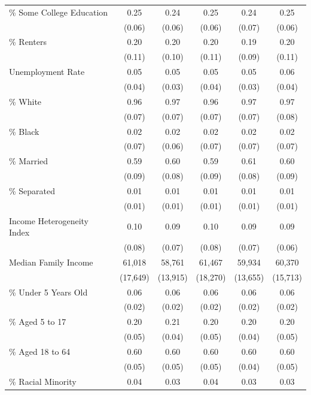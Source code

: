 \begin{table}[H]
\begin{tabular}{>{\raggedright\arraybackslash}p{3.4cm}ccccc}
    \% Some College Education & 0.25 & 0.24 & 0.25 & 0.24 & 0.25 \\
                                & (0.06) & (0.06) & (0.06) & (0.07) & (0.06) \\
    \% Renters & 0.20 & 0.20 & 0.20 & 0.19 & 0.20 \\
                & (0.11) & (0.10) & (0.11) & (0.09) & (0.11) \\
    Unemployment Rate & 0.05 & 0.05 & 0.05 & 0.05 & 0.06 \\
                            & (0.04) & (0.03) & (0.04) & (0.03) & (0.04) \\
    \% White & 0.96 & 0.97 & 0.96 & 0.97 & 0.97 \\
                & (0.07) & (0.07) & (0.07) & (0.07) & (0.08) \\
    \% Black & 0.02 & 0.02 & 0.02 & 0.02 & 0.02 \\
                & (0.07) & (0.06) & (0.07) & (0.07) & (0.07) \\
    \% Married & 0.59 & 0.60 & 0.59 & 0.61 & 0.60 \\
                & (0.09) & (0.08) & (0.09) & (0.08) & (0.09) \\
    \% Separated & 0.01 & 0.01 & 0.01 & 0.01 & 0.01 \\
                    & (0.01) & (0.01) & (0.01) & (0.01) & (0.01) \\
    Income Heterogeneity Index & 0.10 & 0.09 & 0.10 & 0.09 & 0.09 \\
                                & (0.08) & (0.07) & (0.08) & (0.07) & (0.06) \\
    Median Family Income & 61,018 & 58,761 & 61,467 & 59,934 & 60,370 \\
                            & (17,649) & (13,915) & (18,270) & (13,655) & (15,713) \\
    \% Under 5 Years Old & 0.06 & 0.06 & 0.06 & 0.06 & 0.06 \\
                            & (0.02) & (0.02) & (0.02) & (0.02) & (0.02) \\
    \% Aged 5 to 17 & 0.20 & 0.21 & 0.20 & 0.20 & 0.20 \\
                    & (0.05) & (0.04) & (0.05) & (0.04) & (0.05) \\
    \% Aged 18 to 64 & 0.60 & 0.60 & 0.60 & 0.60 & 0.60 \\
                        & (0.05) & (0.05) & (0.05) & (0.04) & (0.05) \\
    \% Racial Minority & 0.04 & 0.03 & 0.04 & 0.03 & 0.03 \\

\end{tabular}
\end{table}
